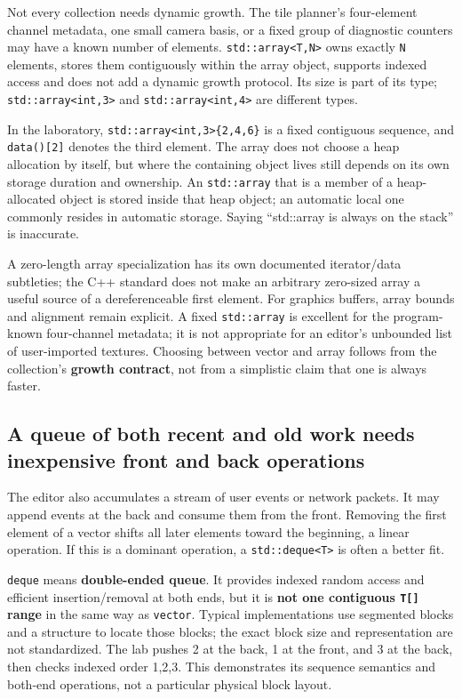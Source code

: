 Not every collection needs dynamic growth. The tile planner's four-element channel metadata, one small camera basis, or a fixed group of diagnostic counters may have a known number of elements. \texttt{std::array\textless{}T,N\textgreater{}} owns exactly \texttt{N} elements, stores them contiguously within the array object, supports indexed access and does not add a dynamic growth protocol. Its size is part of its type; \texttt{std::array\textless{}int,3\textgreater{}} and \texttt{std::array\textless{}int,4\textgreater{}} are different types.

In the laboratory, \texttt{std::array\textless{}int,3\textgreater{}\{2,4,6\}} is a fixed contiguous sequence, and \texttt{data(){[}2{]}} denotes the third element. The array does not choose a heap allocation by itself, but where the containing object lives still depends on its own storage duration and ownership. An \texttt{std::array} that is a member of a heap-allocated object is stored inside that heap object; an automatic local one commonly resides in automatic storage. Saying ``std::array is always on the stack'' is inaccurate.

A zero-length array specialization has its own documented iterator/data subtleties; the C++ standard does not make an arbitrary zero-sized array a useful source of a dereferenceable first element. For graphics buffers, array bounds and alignment remain explicit. A fixed \texttt{std::array} is excellent for the program-known four-channel metadata; it is not appropriate for an editor's unbounded list of user-imported textures. Choosing between vector and array follows from the collection's \textbf{growth contract}, not from a simplistic claim that one is always faster.

\subsection{A queue of both recent and old work needs inexpensive front and back operations}\label{05-engine-i-ch005-a-queue-of-both-recent-and-old-work-needs-inexpensive-front-and-back-operations}

The editor also accumulates a stream of user events or network packets. It may append events at the back and consume them from the front. Removing the first element of a vector shifts all later elements toward the beginning, a linear operation. If this is a dominant operation, a \texttt{std::deque\textless{}T\textgreater{}} is often a better fit.

\texttt{deque} means \textbf{double-ended queue}. It provides indexed random access and efficient insertion/removal at both ends, but it is \textbf{not one contiguous \texttt{T{[}{]}} range} in the same way as \texttt{vector}. Typical implementations use segmented blocks and a structure to locate those blocks; the exact block size and representation are not standardized. The lab pushes 2 at the back, 1 at the front, and 3 at the back, then checks indexed order 1,2,3. This demonstrates its sequence semantics and both-end operations, not a particular physical block layout.


